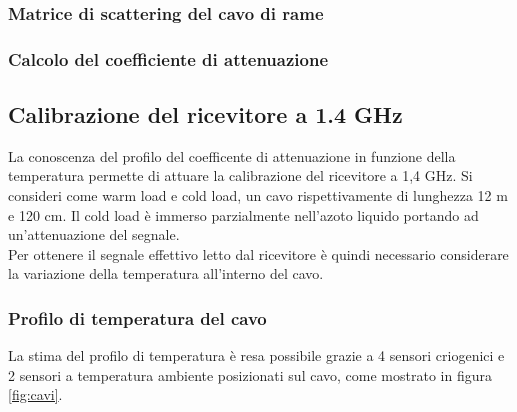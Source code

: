 \subsubsection{Matrice di scattering del cavo di rame}

\subsubsection{Calcolo del coefficiente di attenuazione}
\label{ssec:Calcolo del coefficiente di attenuazione}

\subsection{Calibrazione del ricevitore a 1.4 GHz}

La conoscenza del profilo del coefficente di attenuazione in funzione della temperatura permette di attuare la calibrazione del ricevitore a 1,4 GHz. Si consideri come warm load e cold load, un cavo rispettivamente di lunghezza 12 m e 120 cm. Il cold load è immerso parzialmente nell'azoto liquido portando ad un'attenuazione del segnale.\\
Per ottenere il segnale effettivo letto dal ricevitore è quindi necessario considerare la variazione della temperatura all'interno del cavo.

\subsubsection{Profilo di temperatura del cavo}
\label{ssec:Profilo di temperatura del cavo}

La stima del profilo di temperatura è resa possibile grazie a 4 sensori criogenici e 2 sensori a temperatura ambiente posizionati sul cavo, come mostrato in figura \ref{fig:cavi}. 

